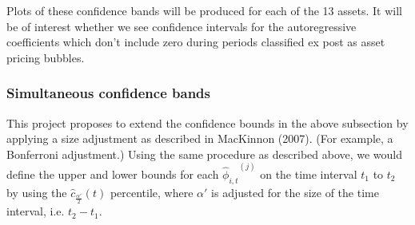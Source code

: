 \documentclass{article}
\begin{document}
\noindent
Plots of these confidence bands will be produced for each of the 13 assets. It will be of interest whether we see confidence intervals for the autoregressive coefficients which don't include zero during periods classified ex post as asset pricing bubbles.

\subsubsection{Simultaneous confidence bands}
This project proposes to extend the confidence bounds in the above subsection by applying a size adjustment as described in MacKinnon (2007). (For example, a Bonferroni adjustment.) Using the same procedure as described above, we would define the upper and lower bounds for each \( {{\hat{\phi}}_{i,t}}^{(j)} \) on the time interval \(t_{1}\) to \(t_{2}\) by using the \(\hat{c}_{\frac{\alpha'}{2}}(t)\) percentile, where \(\alpha'\) is adjusted for the size of the time interval, i.e. \(t_{2} - t_{1}\).
\end{document}
